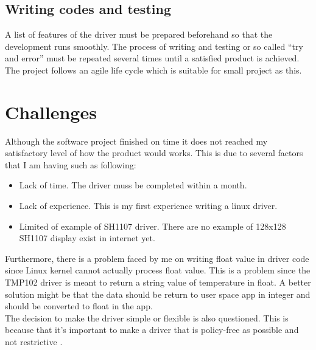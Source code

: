 \subsection{Writing codes and testing}
A list of features of the driver must be prepared beforehand so that the development runs smoothly. The process of writing and testing or so called ``try and error'' must be repeated several times until a satisfied product is achieved. The project follows an agile life cycle which is suitable for small project as this.

\section{Challenges}
Although the software project finished on time it does not reached my satisfactory level of how the product would works. This is due to several factors that I am having such as following:
\begin{itemize}
	\item Lack of time. The driver muss be completed within a month.
	\item Lack of experience. This is my first experience writing a linux driver.
	\item Limited of example of SH1107 driver. There are no example of 128x128 SH1107 display exist in internet yet.
\end{itemize}

Furthermore, there is a problem faced by me on writing float value in driver code since Linux kernel cannot actually process float value. This is a problem since the TMP102 driver is meant to return a string value of temperature in float. A better solution might be that the data should be return to user space app in integer and should be converted to float in the app.\\
The decision to make the driver simple or flexible is also questioned. This is because that it's important to make a driver that is policy-free as possible and not restrictive \cite{rubini_linux_2001}. 